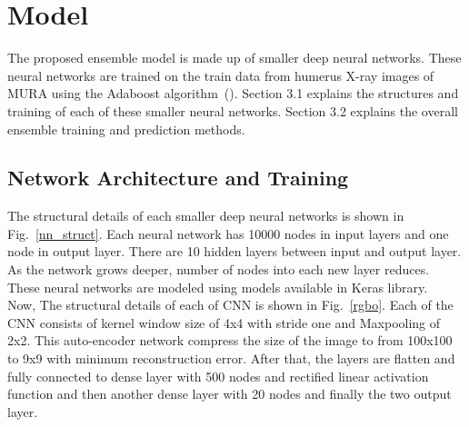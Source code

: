 \documentclass{article}
\begin{document}
\section{Model}
The proposed ensemble model is made up of smaller deep neural networks. These neural networks are trained on the train data from humerus X-ray images of MURA using the Adaboost algorithm~(\cite{adaboost}). Section 3.1 explains the structures and training of each of these smaller neural networks. Section 3.2 explains the overall ensemble training and prediction methods.

\subsection{Network Architecture and Training}
The structural details of each smaller deep neural networks is shown in Fig.~\ref{nn_struct}. Each neural network has 10000 nodes in input layers and one node in output layer. There are 10 hidden layers between input and output layer. As the network grows deeper, number of nodes into each new layer reduces. These neural networks are modeled using models available in Keras library.\\
Now, The structural details of each of CNN is shown in Fig.~\ref{rgbo}. Each of the CNN consists of kernel window size of 4x4 with stride one and Maxpooling of 2x2. This auto-encoder network compress the size of the image to from 100x100 to 9x9 with minimum reconstruction error. After that, the layers are flatten and fully connected to dense layer with 500 nodes and rectified linear activation function and then another dense layer with 20 nodes and finally the two output layer. 
\end{document}
